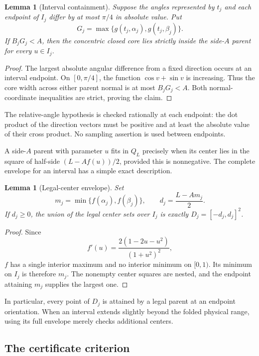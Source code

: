 \documentclass[11pt]{article}
\newtheorem{lemma}[theorem]{Lemma}
\newcommand{\Q}{Q}
\begin{document}
\begin{lemma}[Interval containment]\label{lem:contain}
Suppose the angles represented by $t_j$ and each endpoint of $I_j$ differ
by at most $\pi/4$ in absolute value. Put
\[
  G_j=\max\{g(t_j,\alpha_j),g(t_j,\beta_j)\}.
\]
If $B_jG_j<A$, then the concentric closed core lies strictly inside the
side-$A$ parent for every $u\in I_j$.
\end{lemma}

\begin{proof}
The largest absolute angular difference from a fixed direction occurs at an
interval endpoint. On $[0,\pi/4]$, the function $\cos v+\sin v$ is increasing.
Thus the core width across either parent normal is at most $B_jG_j<A$.
Both normal-coordinate inequalities are strict, proving the claim.
\end{proof}

The relative-angle hypothesis is checked rationally at each endpoint: the dot
product of the direction vectors must be positive and at least the absolute
value of their cross product. No sampling assertion is used between endpoints.

A side-$A$ parent with parameter $u$ fits in $\Q_L$ precisely when its center
lies in the square of half-side $(L-Af(u))/2$, provided this is nonnegative.
The complete envelope for an interval has a simple exact description.

\begin{lemma}[Legal-center envelope]\label{lem:domain}
Set
\[
  m_j=\min\{f(\alpha_j),f(\beta_j)\},\qquad
  d_j=\frac{L-Am_j}{2}.
\]
If $d_j\ge0$, the union of the legal center sets over $I_j$ is exactly
$D_j=[-d_j,d_j]^2$.
\end{lemma}

\begin{proof}
Since
\[
  f'(u)=\frac{2(1-2u-u^2)}{(1+u^2)^2},
\]
$f$ has a single interior maximum and no interior minimum on $[0,1)$.
Its minimum on $I_j$ is therefore $m_j$. The nonempty center squares are
nested, and the endpoint attaining $m_j$ supplies the largest one.
\end{proof}

In particular, every point of $D_j$ is attained by a legal parent at an
endpoint orientation. When an interval extends slightly beyond the folded
physical range, using its full envelope merely checks additional centers.

\subsection{The certificate criterion}
\end{document}
